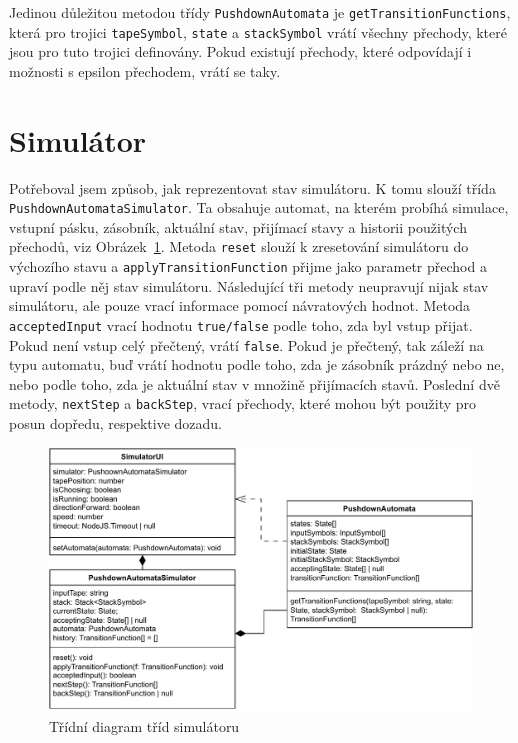 Jedinou důležitou metodou třídy \texttt{PushdownAutomata} je \texttt{getTransitionFunctions}, která pro trojici \texttt{tapeSymbol}, \texttt{state} a \texttt{stackSymbol} vrátí všechny přechody, které jsou pro tuto trojici definovány. Pokud existují přechody, které odpovídají i možnosti s epsilon přechodem, vrátí se taky.

\section{Simulátor}

Potřeboval jsem způsob, jak reprezentovat stav simulátoru. K tomu slouží třída \texttt{PushdownAutomataSimulator}. Ta obsahuje automat, na kterém probíhá simulace, vstupní pásku, zásobník, aktuální stav, přijímací stavy a historii použitých přechodů, viz Obrázek~\ref{fig:SimulatorClasses}. Metoda \texttt{reset} slouží k zresetování simulátoru do výchozího stavu a \texttt{applyTransitionFunction} přijme jako parametr přechod a upraví podle něj stav simulátoru. Následující tři metody neupravují nijak stav simulátoru, ale pouze vrací informace pomocí návratových hodnot. Metoda \texttt{acceptedInput} vrací hodnotu \texttt{true/false} podle toho, zda byl vstup přijat. Pokud není vstup celý přečtený, vrátí \texttt{false}. Pokud je přečtený, tak záleží na typu automatu, buď vrátí hodnotu podle toho, zda je zásobník prázdný nebo ne, nebo podle toho, zda je aktuální stav v množině přijímacích stavů.
Poslední dvě metody, \texttt{nextStep} a \texttt{backStep}, vrací přechody, které mohou být použity pro posun dopředu, respektive dozadu.

\begin{figure}[h]
    \centering
    \includegraphics[width=\textwidth]{Figures/SimulatorClasses.drawio.pdf}
    \caption{Třídní diagram tříd simulátoru}\label{fig:SimulatorClasses}
\end{figure}

